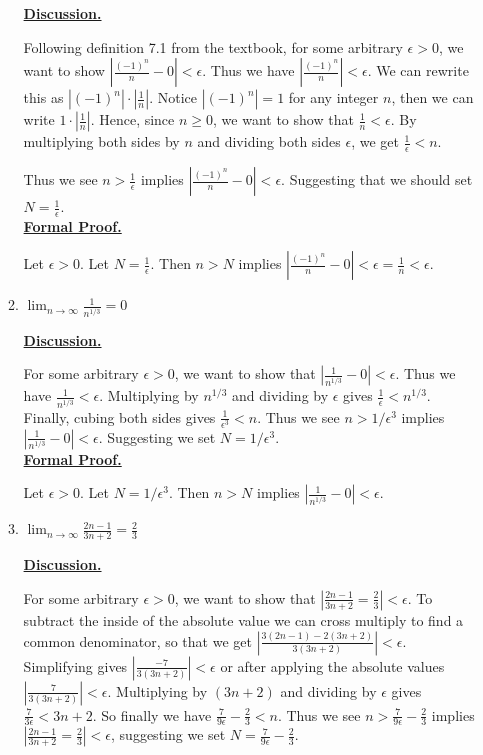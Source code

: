 \documentclass [10pt]{article}
\newcommand{\jg}[1]{{\color{blue} #1}}
\begin{document}
\begin{enumerate}
\begin{enumerate}
\jg{
\textbf{\underline{Discussion.}}

Following definition 7.1 from the textbook, for some arbitrary $\epsilon > 0$, we want to show $| \frac{(-1)^n}{n} - 0 | < \epsilon$. Thus we have $| \frac{(-1)^n}{n}| < \epsilon$. We can rewrite this as $|(-1)^n| \cdot |\frac{1}{n}|$. Notice $|(-1)^n| = 1$ for any integer $n$, then we can write $1 \cdot |\frac{1}{n}|$. Hence, since $n \geq 0$, we want to show that $\frac{1}{n} < \epsilon$. By multiplying both sides by $n$ and dividing both sides $\epsilon$, we get $\frac{1}{\epsilon} < n$. 

Thus we see $n > \frac{1}{\epsilon}$ implies $|\frac{(-1)^n}{n} - 0 | < \epsilon$. Suggesting that we should set $N = \frac{1}{\epsilon}$. \\

\textbf{\underline{Formal Proof.}}

Let $\epsilon > 0$. Let $N = \frac{1}{\epsilon}$. Then $n > N$ implies $|\frac{(-1)^n}{n} - 0 | < \epsilon = \frac{1}{n} < \epsilon$. \\
}
\item $\lim_{n \to \infty} \frac{1}{n^{1/3}}=0$

\jg{
\textbf{\underline{Discussion.}}

For some arbitrary $\epsilon > 0$, we want to show that $|\frac{1}{n^{1/3}} - 0| < \epsilon$. Thus we have $\frac{1}{n^{1/3}} < \epsilon$. Multiplying by ${n^{1/3}}$ and dividing by $\epsilon$ gives $\frac{1}{\epsilon} < {n^{1/3}}$. Finally, cubing both sides gives $\frac{1}{\epsilon^3} < n$. Thus we see $n > 1/\epsilon^3$ implies $|\frac{1}{n^{1/3}} - 0| < \epsilon$. Suggesting we set $N = 1/\epsilon^3$. \\

\textbf{\underline{Formal Proof.}}

Let $\epsilon > 0$. Let $N = 1/\epsilon^3$. Then $n > N$ implies $|\frac{1}{n^{1/3}} - 0| < \epsilon$. \\
}
\item $\lim_{n \to \infty} \frac{2n-1}{3n+2}=\frac{2}{3}$

\jg{
\textbf{\underline{Discussion.}}

For some arbitrary $\epsilon > 0$, we want to show that $|\frac{2n-1}{3n+2}=\frac{2}{3}| < \epsilon$. To subtract the inside of the absolute value we can cross multiply to find a common denominator, so that we get $|\frac{3(2n-1) - 2(3n+2)}{3(3n+2)}| < \epsilon$. Simplifying gives $|\frac{-7}{3(3n+2)}| < \epsilon$ or after applying the absolute values $|\frac{7}{3(3n+2)}| < \epsilon$. Multiplying by $(3n+2)$ and dividing by $\epsilon$ gives $\frac{7}{3 \epsilon} < 3n + 2$. So finally we have $\frac{7}{9 \epsilon} - \frac{2}{3} < n$. Thus we see $n > \frac{7}{9 \epsilon} - \frac{2}{3}$ implies $|\frac{2n-1}{3n+2}=\frac{2}{3}| < \epsilon$, suggesting we set $N = \frac{7}{9 \epsilon} - \frac{2}{3}$. \\

}
\end{enumerate}
\end{enumerate}
\end{document}
